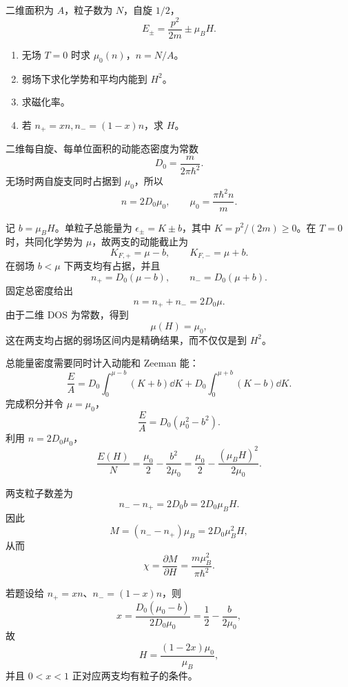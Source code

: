 \begin{question}
二维面积为 $A$，粒子数为 $N$，自旋 $1/2$，
\[E_\pm=\frac{p^2}{2m}\pm\mu_BH.\]
\begin{enumerate}
\item 无场 $T=0$ 时求 $\mu_0(n)$，$n=N/A$。
\item 弱场下求化学势和平均内能到 $H^2$。
\item 求磁化率。
\item 若 $n_+=xn,n_-=(1-x)n$，求 $H$。
\end{enumerate}
\begin{solution}
二维每自旋、每单位面积的动能态密度为常数
\[
D_0=\frac{m}{2\pi\hbar^2}.
\]
无场时两自旋支同时占据到 $\mu_0$，所以
\[
n=2D_0\mu_0,
\qquad
\boxed{\mu_0=\frac{\pi\hbar^2n}{m}}.
\]

记 $b=\mu_BH$。单粒子总能量为 $\epsilon_\pm=K\pm b$，其中 $K=p^2/(2m)\ge0$。在 $T=0$ 时，共同化学势为 $\mu$，故两支的动能截止为
\[
K_{F,+}=\mu-b,\qquad K_{F,-}=\mu+b.
\]
在弱场 $b<\mu$ 下两支均有占据，并且
\[
n_+=D_0(\mu-b),\qquad n_-=D_0(\mu+b).
\]
固定总密度给出
\[
n=n_++n_-=2D_0\mu.
\]
由于二维 DOS 为常数，得到
\[
\boxed{\mu(H)=\mu_0},
\]
这在两支均占据的弱场区间内是精确结果，而不仅仅是到 $H^2$。

总能量密度需要同时计入动能和 Zeeman 能：
\[
\frac{E}{A}
=D_0\int_0^{\mu-b}(K+b)\dd{K}
+D_0\int_0^{\mu+b}(K-b)\dd{K}.
\]
完成积分并令 $\mu=\mu_0$，
\[
\frac{E}{A}=D_0(\mu_0^2-b^2).
\]
利用 $n=2D_0\mu_0$，
\[
\boxed{\frac{E(H)}{N}
=\frac{\mu_0}{2}-\frac{b^2}{2\mu_0}
=\frac{\mu_0}{2}-\frac{(\mu_BH)^2}{2\mu_0}}.
\]

两支粒子数差为
\[
n_--n_+=2D_0b=2D_0\mu_BH.
\]
因此
\[
M=(n_--n_+)\mu_B=2D_0\mu_B^2H,
\]
从而
\[
\boxed{\chi=\frac{\partial M}{\partial H}
=\frac{m\mu_B^2}{\pi\hbar^2}}.
\]

若题设给 $n_+=xn$、$n_-=(1-x)n$，则
\[
x=\frac{D_0(\mu_0-b)}{2D_0\mu_0}
=\frac12-\frac{b}{2\mu_0},
\]
故
\[
\boxed{H=\frac{(1-2x)\mu_0}{\mu_B}},
\]
并且 $0<x<1$ 正对应两支均有粒子的条件。
\end{solution}
\end{question}


